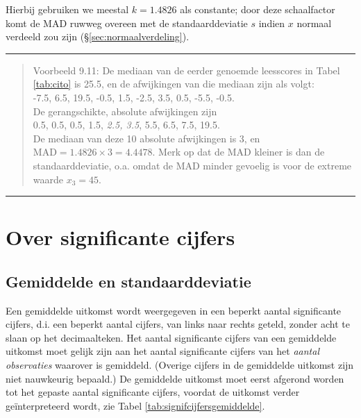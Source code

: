 \documentclass[
]{book}
\begin{document}
Hierbij gebruiken we meestal \(k=1.4826\) als constante; door deze schaalfactor komt de MAD
ruwweg overeen met de standaarddeviatie \(s\) indien \(x\) normaal verdeeld
zou zijn (§\ref{sec:normaalverdeling}).

\begin{center}\rule{0.5\linewidth}{0.5pt}\end{center}

\begin{quote}
Voorbeeld 9.11:
De mediaan van de eerder genoemde leesscores in
Tabel \ref{tab:cito} is
25.5, en de afwijkingen van die mediaan zijn als volgt:\\
-7.5, 6.5, 19.5, -0.5, 1.5, -2.5, 3.5, 0.5, -5.5, -0.5.\\
De gerangschikte, absolute afwijkingen zijn\\
0.5, 0.5, 0.5, 1.5, \emph{2.5, 3.5}, 5.5, 6.5, 7.5, 19.5.\\
De mediaan van deze 10 absolute afwijkingen is 3, en
\(\textrm{MAD} = 1.4826 \times 3 = 4.4478\). Merk op dat de MAD kleiner is
dan de standaarddeviatie, o.a. omdat de MAD minder gevoelig is voor de
extreme waarde \(x_3=45\).
\end{quote}

\begin{center}\rule{0.5\linewidth}{0.5pt}\end{center}

\section{Over significante cijfers}\label{sec:significantecijfers}

\subsection{Gemiddelde en standaarddeviatie}\label{sec:significantecijfers-gemiddelde}

Een gemiddelde uitkomst wordt weergegeven in een beperkt aantal
significante cijfers, d.i. een beperkt aantal cijfers, van links naar
rechts geteld, zonder acht te slaan op het decimaalteken. Het aantal
significante cijfers van een gemiddelde uitkomst moet gelijk zijn aan
het aantal significante cijfers van het \emph{aantal observaties} waarover is
gemiddeld. (Overige cijfers in de gemiddelde uitkomst zijn niet
nauwkeurig bepaald.) De gemiddelde uitkomst moet eerst afgerond worden
tot het gepaste aantal significante cijfers, voordat de uitkomst verder
geïnterpreteerd wordt, zie
Tabel \ref{tab:signifcijfersgemiddelde}.
\end{document}
